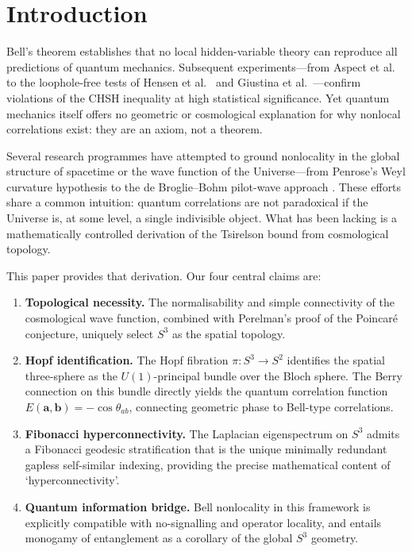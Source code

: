 \documentclass[12pt,a4paper]{article}
\theoremstyle{definition}
\theoremstyle{remark}
\begin{document}
\tableofcontents
\newpage

\section{Introduction}

Bell's theorem \cite{Bell1964} establishes that no local hidden-variable theory
can reproduce all predictions of quantum mechanics. Subsequent experiments---from
Aspect et al.\ \cite{Aspect1982} to the loophole-free tests of Hensen et al.\
\cite{Hensen2015} and Giustina et al.\ \cite{Giustina2015}---confirm violations
of the CHSH inequality \cite{CHSH1969} at high statistical significance. Yet
quantum mechanics itself offers no geometric or cosmological explanation for why
nonlocal correlations exist: they are an axiom, not a theorem.

Several research programmes have attempted to ground nonlocality in the global
structure of spacetime or the wave function of the Universe---from Penrose's Weyl
curvature hypothesis \cite{Penrose1979} to the de Broglie--Bohm pilot-wave
approach \cite{Holland1993}. These efforts share a common intuition: quantum
correlations are not paradoxical if the Universe is, at some level, a single
indivisible object. What has been lacking is a mathematically controlled derivation
of the Tsirelson bound from cosmological topology.

This paper provides that derivation. Our four central claims are:

\begin{enumerate}[label=(\roman*)]
\item \textbf{Topological necessity.} The normalisability and simple connectivity
of the cosmological wave function, combined with Perelman's proof of the
Poincar\'e conjecture, uniquely select $S^3$ as the spatial topology.

\item \textbf{Hopf identification.} The Hopf fibration $\pi: S^3 \to S^2$
identifies the spatial three-sphere as the $U(1)$-principal bundle over the
Bloch sphere. The Berry connection on this bundle directly yields the quantum
correlation function $E(\mathbf{a},\mathbf{b}) = -\cos\theta_{ab}$, connecting
geometric phase to Bell-type correlations.

\item \textbf{Fibonacci hyperconnectivity.} The Laplacian eigenspectrum on $S^3$
admits a Fibonacci geodesic stratification that is the unique minimally redundant
gapless self-similar indexing, providing the precise mathematical content of
`hyperconnectivity'.

\item \textbf{Quantum information bridge.} Bell nonlocality in this framework is
explicitly compatible with no-signalling and operator locality, and entails
monogamy of entanglement as a corollary of the global $S^3$ geometry.
\end{enumerate}
\end{document}
